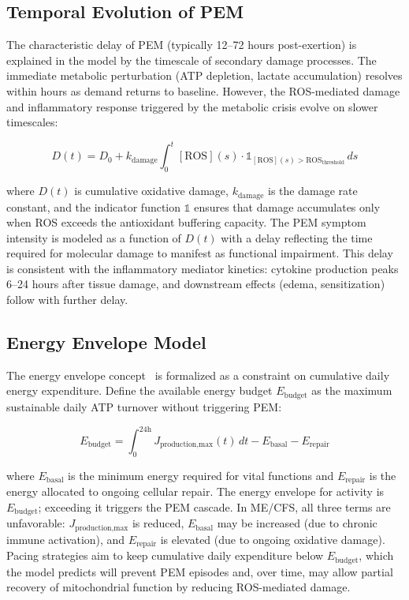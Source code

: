 \subsection{Temporal Evolution of PEM}
\label{sec:pem-temporal}

The characteristic delay of PEM (typically 12--72 hours post-exertion) is explained in the model by the timescale of secondary damage processes. The immediate metabolic perturbation (ATP depletion, lactate accumulation) resolves within hours as demand returns to baseline. However, the ROS-mediated damage and inflammatory response triggered by the metabolic crisis evolve on slower timescales:

\begin{equation}
\label{eq:pem-delay}
D(t) = D_0 + k_{\text{damage}} \int_0^t [\text{ROS}](s) \cdot \mathbb{1}_{[\text{ROS}](s) > \text{ROS}_{\text{threshold}}} \, ds
\end{equation}

where $D(t)$ is cumulative oxidative damage, $k_{\text{damage}}$ is the damage rate constant, and the indicator function $\mathbb{1}$ ensures that damage accumulates only when ROS exceeds the antioxidant buffering capacity. The PEM symptom intensity is modeled as a function of $D(t)$ with a delay reflecting the time required for molecular damage to manifest as functional impairment. This delay is consistent with the inflammatory mediator kinetics: cytokine production peaks 6--24 hours after tissue damage, and downstream effects (edema, sensitization) follow with further delay.

\subsection{Energy Envelope Model}
\label{sec:energy-envelope-model}

The energy envelope concept~\cite{jason2012energy,jason2009energy} is formalized as a constraint on cumulative daily energy expenditure. Define the available energy budget $E_{\text{budget}}$ as the maximum sustainable daily ATP turnover without triggering PEM:

\begin{equation}
\label{eq:energy-envelope}
E_{\text{budget}} = \int_0^{24\text{h}} J_{\text{production,max}}(t) \, dt - E_{\text{basal}} - E_{\text{repair}}
\end{equation}

where $E_{\text{basal}}$ is the minimum energy required for vital functions and $E_{\text{repair}}$ is the energy allocated to ongoing cellular repair. The energy envelope for activity is $E_{\text{budget}}$; exceeding it triggers the PEM cascade. In ME/CFS, all three terms are unfavorable: $J_{\text{production,max}}$ is reduced, $E_{\text{basal}}$ may be increased (due to chronic immune activation), and $E_{\text{repair}}$ is elevated (due to ongoing oxidative damage). Pacing strategies aim to keep cumulative daily expenditure below $E_{\text{budget}}$, which the model predicts will prevent PEM episodes and, over time, may allow partial recovery of mitochondrial function by reducing ROS-mediated damage.

